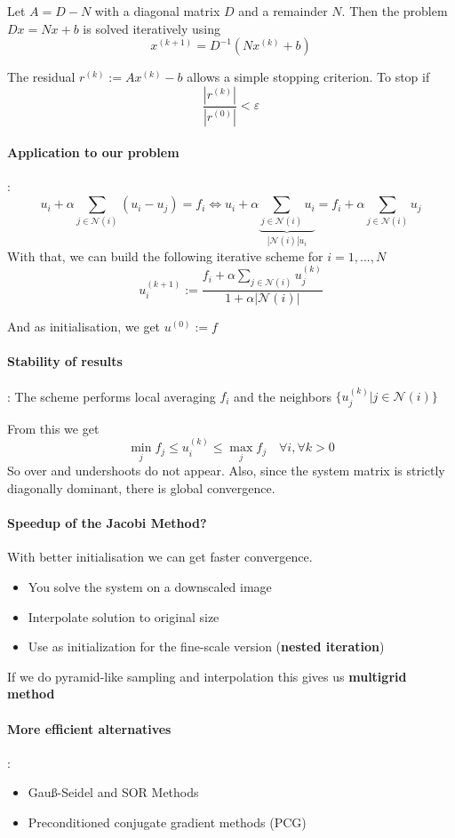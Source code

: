 \documentclass{article}
\begin{document}
Let $A=D-N$ with a diagonal matrix $D$ and a remainder $N$. Then the problem $Dx = Nx + b$ is solved iteratively using
\[x^{(k+1)} = D^{-1}(Nx^{(k)} + b)\]

The residual $r^{(k)} := Ax^{(k)} - b$ allows a simple stopping criterion. To stop if
\[\frac{|r^{(k)}|}{|r^{(0)}|} < \varepsilon\]


\paragraph{Application to our problem}: 
\[u_i + \alpha\sum_{j\in \mathcal{N}(i)}(u_i-u_j) = f_i \Leftrightarrow u_i + \alpha \underbrace{\sum_{j\in\mathcal{N}(i)}u_i}_{|\mathcal{N}(i)|u_i} = f_i + \alpha \sum_{j\in\mathcal{N}(i)}u_j\]
With that, we can build the following iterative scheme for $i=1,...,N$
\[u_i^{(k+1)} := \frac{f_i + \alpha \sum_{j\in\mathcal{N}(i)}u_j^{(k)}}{1+\alpha |\mathcal{N}(i)|}\]

And as initialisation, we get $u^{(0)} := f$

\paragraph{Stability of results}: The scheme performs local averaging $f_i$ and the neighbors $\{u_j^{(k)} | j \in \mathcal{N}(i)\}$

From this we get
\[\min_j f_j \leq u_i^{(k)} \leq \max_j f_j \quad \forall i, \forall k > 0\]
So over and undershoots do not appear. Also, since the system matrix is strictly diagonally dominant, there is global convergence.

\paragraph{Speedup of the Jacobi Method?} With better initialisation we can get faster convergence.
\begin{itemize}
  \item You solve the system on a downscaled image
  \item Interpolate solution to original size
  \item Use as initialization for the fine-scale version (\textbf{nested iteration})
\end{itemize}
If we do pyramid-like sampling and interpolation this gives us \textbf{multigrid method}

\paragraph{More efficient alternatives}: 
\begin{itemize}
  \item Gau\ss -Seidel and SOR Methods
  \item Preconditioned conjugate gradient methods (PCG)
\end{itemize}
\end{document}
